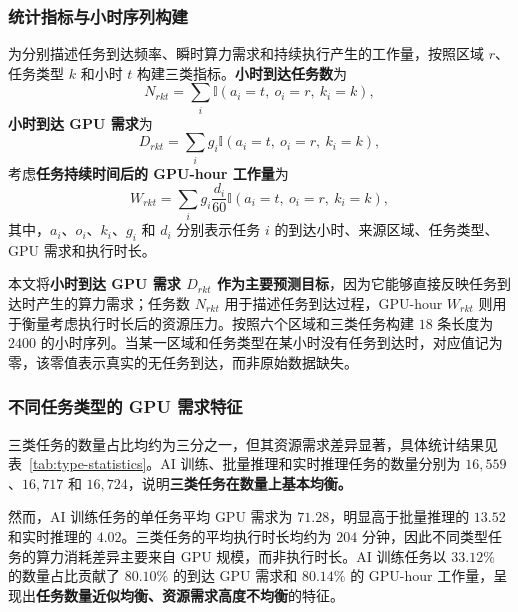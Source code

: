 \documentclass[UTF8,a4paper,zihao=-4]{ctexart}
\begin{document}
\subsubsection{统计指标与小时序列构建}

为分别描述任务到达频率、瞬时算力需求和持续执行产生的工作量，按照区域 $r$、任务类型 $k$ 和小时 $t$ 构建三类指标。\textbf{小时到达任务数}为
\begin{equation}
N_{rkt}=\sum_i\mathbb{I}(a_i=t,\ o_i=r,\ k_i=k),
\end{equation}
\textbf{小时到达 GPU 需求}为
\begin{equation}
D_{rkt}=\sum_i g_i\mathbb{I}(a_i=t,\ o_i=r,\ k_i=k),
\end{equation}
考虑\textbf{任务持续时间后的 GPU-hour 工作量}为
\begin{equation}
W_{rkt}=\sum_i g_i\frac{d_i}{60}
\mathbb{I}(a_i=t,\ o_i=r,\ k_i=k),
\end{equation}
其中，$a_i$、$o_i$、$k_i$、$g_i$ 和 $d_i$ 分别表示任务 $i$ 的到达小时、来源区域、任务类型、GPU 需求和执行时长。

本文将\textbf{小时到达 GPU 需求 $D_{rkt}$ 作为主要预测目标}，因为它能够直接反映任务到达时产生的算力需求；任务数 $N_{rkt}$ 用于描述任务到达过程，GPU-hour $W_{rkt}$ 则用于衡量考虑执行时长后的资源压力。按照六个区域和三类任务构建 $18$ 条长度为 $2400$ 的小时序列。当某一区域和任务类型在某小时没有任务到达时，对应值记为零，该零值表示真实的无任务到达，而非原始数据缺失。

\subsubsection{不同任务类型的 GPU 需求特征}

三类任务的数量占比均约为三分之一，但其资源需求差异显著，具体统计结果见表~\ref{tab:type-statistics}。AI 训练、批量推理和实时推理任务的数量分别为 $16{,}559$、$16{,}717$ 和 $16{,}724$，说明\textbf{三类任务在数量上基本均衡。}

然而，AI 训练任务的单任务平均 GPU 需求为 $71.28$，明显高于批量推理的 $13.52$ 和实时推理的 $4.02$。三类任务的平均执行时长均约为 $204$ 分钟，因此不同类型任务的算力消耗差异主要来自 GPU 规模，而非执行时长。AI 训练任务以 $33.12\%$ 的数量占比贡献了 $80.10\%$ 的到达 GPU 需求和 $80.14\%$ 的 GPU-hour 工作量，呈现出\textbf{任务数量近似均衡、资源需求高度不均衡}的特征。

\begin{table}[htbp]
\centering
\footnotesize
\caption{不同任务类型的 GPU 需求统计}
\label{tab:type-statistics}
\end{table}
\end{document}
